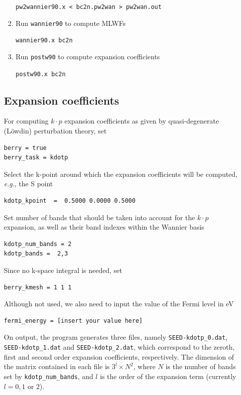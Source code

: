 \documentclass[a4paper,11pt,twoside]{article}
\begin{document}
\begin{itemize}
\begin{enumerate}
\begin{itemize}
\end{itemize}


\verb|pw2wannier90.x < bc2n.pw2wan > pw2wan.out|

\item Run {\tt wannier90} to  compute MLWFs

\verb|wannier90.x bc2n|

\item Run {\tt postw90} to compute expansion coefficients

\verb|postw90.x bc2n| 


\end{enumerate}


\subsection*{Expansion coefficients}

For computing $k\cdot p$ expansion coefficients as given by quasi-degenerate (L\"owdin) 
perturbation theory, set
\begin{verbatim}
berry = true
berry_task = kdotp
\end{verbatim}
Select the k-point around which the expansion coefficients will be computed, \textit{e.g.}, the S point
\begin{verbatim}
kdotp_kpoint  =  0.5000 0.0000 0.5000
\end{verbatim}
Set number of bands that should be taken into account for the $k\cdot p$ expansion, as well
as their band indexes within the Wannier basis
\begin{verbatim}
kdotp_num_bands = 2
kdotp_bands =  2,3
\end{verbatim}
Since no k-space integral is needed, set
\begin{verbatim}
berry_kmesh = 1 1 1
\end{verbatim}
Although not used, we also need to input the value of the Fermi level in eV
\begin{verbatim}
fermi_energy = [insert your value here]
\end{verbatim}



On output, the program generates three files, namely \verb|SEED-kdotp_0.dat|, 
\verb|SEED-kdotp_1.dat| and  \verb|SEED-kdotp_2.dat|, which correspond to the zeroth, first and second 
order expansion coefficients, respectively. The dimension of the matrix contained in each file 
is $3^{l}\times N^{2}$, where $N$ is the number of bands set by \verb|kdotp_num_bands|, and $l$
is the order of the expansion term (currently $l=0,1$ or $2$). 


\end{itemize}
\end{document}

